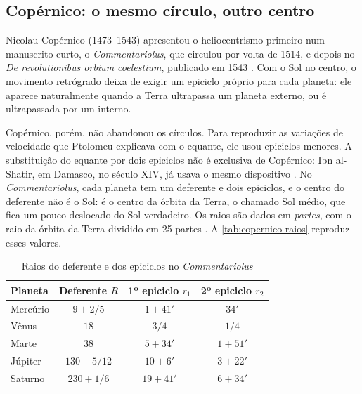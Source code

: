 \subsection{Copérnico: o mesmo círculo, outro centro}

Nicolau Copérnico (1473--1543) apresentou o heliocentrismo primeiro num manuscrito curto, o \emph{Commentariolus}, que circulou por volta de 1514, e depois no \emph{De revolutionibus orbium coelestium}, publicado em 1543 \cite{martins2003,kuhn2002}. Com o Sol no centro, o movimento retrógrado deixa de exigir um epiciclo próprio para cada planeta: ele aparece naturalmente quando a Terra ultrapassa um planeta externo, ou é ultrapassada por um interno.

Copérnico, porém, não abandonou os círculos. Para reproduzir as variações de velocidade que Ptolomeu explicava com o equante, ele usou epiciclos menores. A substituição do equante por dois epiciclos não é exclusiva de Copérnico: Ibn al-Shatir, em Damasco, no século XIV, já usava o mesmo dispositivo \cite{kennedy1959,swerdlow1973}. No \emph{Commentariolus}, cada planeta tem um deferente e dois epiciclos, e o centro do deferente não é o Sol: é o centro da órbita da Terra, o chamado Sol médio, que fica um pouco deslocado do Sol verdadeiro. Os raios são dados em \emph{partes}, com o raio da órbita da Terra dividido em 25 partes \cite{martins2003,farias2016}. A \autoref{tab:copernico-raios} reproduz esses valores.

\begin{table}[htb]
  \centering
  \caption{Raios do deferente e dos epiciclos no \emph{Commentariolus}}
  \label{tab:copernico-raios}
  \begin{tabular}{lccc}
    \toprule
    Planeta & Deferente $R$ & 1º epiciclo $r_1$ & 2º epiciclo $r_2$ \\
    \midrule
    Mercúrio & $9 + 2/5$ & $1 + 41'$ & $34'$ \\
    Vênus    & $18$ & $3/4$ & $1/4$ \\
    Marte    & $38$ & $5 + 34'$ & $1 + 51'$ \\
    Júpiter  & $130 + 5/12$ & $10 + 6'$ & $3 + 22'$ \\
    Saturno  & $230 + 1/6$ & $19 + 41'$ & $6 + 34'$ \\
    \bottomrule
  \end{tabular}
\end{table}

